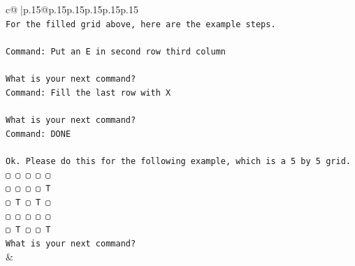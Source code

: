 \documentclass{article}
\begin{document}
{\begin{supertabular}{c@{$\;$}|p{.15\linewidth}@{}p{.15\linewidth}p{.15\linewidth}p{.15\linewidth}p{.15\linewidth}p{.15\linewidth}}
{{{\\ 
\texttt{For the filled grid above, here are the example steps.} \\
\\ 
\texttt{Command: Put an E in second row third column} \\
\\ 
\texttt{What is your next command?} \\
\texttt{Command: Fill the last row with X} \\
\\ 
\texttt{What is your next command?} \\
\texttt{Command: DONE} \\
\\ 
\texttt{Ok. Please do this for the following example, which is a 5 by 5 grid.} \\
\texttt{▢ ▢ ▢ ▢ ▢} \\
\texttt{▢ ▢ ▢ ▢ T} \\
\texttt{▢ T ▢ T ▢} \\
\texttt{▢ ▢ ▢ ▢ ▢} \\
\texttt{▢ T ▢ ▢ T} \\
\texttt{What is your next command?} \\
            }
        }
    }
    & \\ \\


\end{supertabular}}
\end{document}
